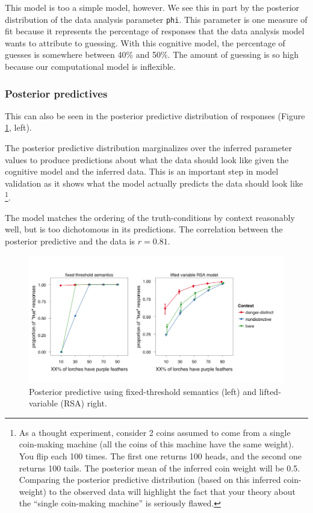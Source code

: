 \documentclass[10pt,letterpaper]{article}
\begin{document}
This model is too a simple model, however. We see this in part by the posterior distribution of the data analysis parameter \lstinline{phi}. This parameter is one measure of fit because it represents the percentage of responses that the data analysis model wants to attribute to guessing. With this cognitive model, the percentage of guesses is somewhere between 40\% and 50\%. The amount of guessing is so high because our computational model is inflexible.

\subsubsection{Posterior predictives}

This can also be seen in the posterior predictive distribution of responses (Figure \ref{fig:bda1posteriorpred}, left). 

The posterior predictive distribution marginalizes over the inferred parameter values to produce predictions about what the data should look like given the cognitive model and the inferred data. This is an important step in model validation as it shows what the model actually predicts the data should look like \footnote{As a thought experiment, consider 2 coins assumed to come from a single coin-making machine (all the coins of this machine have the same weight). You flip each 100 times. The first one returns 100 heads, and the second one returns 100 tails. The posterior mean of the inferred coin weight will be 0.5. Comparing the posterior predictive distribution (based on this inferred coin-weight) to the observed data will highlight the fact that your theory about the ``single coin-making machine'' is seriously flawed.}.

The model matches the ordering of the truth-conditions by context reasonably well, but is too dichotomous in its predictions. The correlation between the posterior predictive and the data is $r = 0.81$. 

\begin{figure}
\centering
    \includegraphics[width=\columnwidth]{fig3_2pps}
    \caption{Posterior predictive using fixed-threshold semantics (left) and lifted-variable (RSA) right.}
  \label{fig:bda1posteriorpred}
\end{figure}
\end{document}
